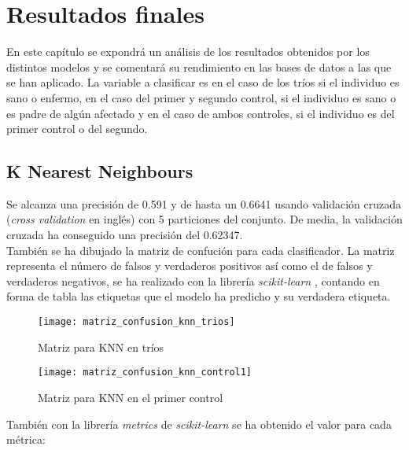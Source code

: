 
\chapter{Resultados finales}
En este capítulo se expondrá un análisis de los resultados obtenidos por los distintos modelos y se comentará su rendimiento en las bases de datos a las que se han aplicado. La variable a clasificar es en el caso de los tríos si el individuo es sano o enfermo, en el caso del primer y segundo control, si el individuo es sano o es padre de algún afectado y en el caso de ambos controles, si el individuo es del primer control o del segundo.

\section{K Nearest Neighbours}
Se alcanza una precisión de 0.591 y de hasta un 0.6641 usando validación cruzada (\textit{cross validation} en inglés) con 5 particiones del conjunto. De media, la validación cruzada ha conseguido una precisión del 0.62347.\\
También se ha dibujado \cite{Hunter:2007} la matriz de confución para cada clasificador. La matriz representa el número de falsos y verdaderos positivos así como el de falsos y verdaderos negativos, se ha realizado con la librería \textit{scikit-learn} \cite{scikit2021metrics}, contando en forma de tabla las etiquetas que el modelo ha predicho y su verdadera etiqueta.

\begin{figure}[H]
\centering
\begin{minipage}[t]{.5\textwidth}
  \texttt{[image: matriz\_confusion\_knn\_trios]}
  \caption{Matriz para KNN en tríos}
  \label{fig:confusion-knn-trios}
\end{minipage}%
\begin{minipage}[t]{.5\textwidth}
  \texttt{[image: matriz\_confusion\_knn\_control1]}
  \caption{Matriz para KNN en el primer control}
  \label{fig:confusion-knn-control1}
\end{minipage}
\end{figure}

También con la librería \textit{metrics} de \textit{scikit-learn} se ha obtenido el valor para cada métrica:

